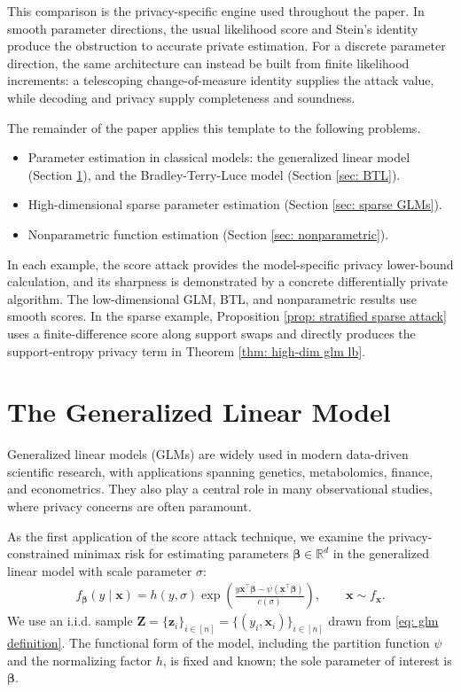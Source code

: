 \documentclass[letterpaper,12pt]{article}
\numberwithin{equation}{section}
\theoremstyle{plain}
\numberwithin{Theorem}{section}
\numberwithin{proposition}{section}
\numberwithin{Lemma}{section}
{
	\theoremstyle{definition}
	\newtheorem{Definition}{Definition}
	\newtheorem{example}{Example}
	\numberwithin{example}{section}
	\newtheorem{fact}{Fact}
	\numberwithin{fact}{section}
	\newtheorem{remark}{Remark}
}
\newcommand{\rev}[1]{#1}
\newcommand{\furtherrev}[1]{#1}
\newcommand{\1}{\mathbbm{1}}
\def\bbeta{{\boldsymbol{\beta}}}
\def\R{{\mathbb R}}
\begin{document}
\rev{This comparison is the privacy-specific engine used throughout the paper. In smooth parameter directions, the usual likelihood score and Stein's identity produce the obstruction to accurate private estimation. For a discrete parameter direction, the same architecture can instead be built from finite likelihood increments: a telescoping change-of-measure identity supplies the attack value, while decoding and privacy supply completeness and soundness.}

The remainder of the paper applies this template to the following problems.
\begin{itemize}
	\item Parameter estimation in classical models: the generalized linear model (Section \ref{sec: GLMs}), and the Bradley-Terry-Luce model (Section \ref{sec: BTL}).
	\item High-dimensional sparse parameter estimation (Section \ref{sec: sparse GLMs}).
	\item \furtherrev{Nonparametric} function estimation (Section \ref{sec: nonparametric}).
\end{itemize}
\rev{In each example, the score attack provides the model-specific privacy lower-bound calculation, and its sharpness is demonstrated by a concrete differentially private algorithm. The low-dimensional GLM, BTL, and \furtherrev{nonparametric} results use smooth scores. In the sparse example, Proposition \ref{prop: stratified sparse attack} uses a finite-difference score along support swaps and directly produces the support-entropy privacy term in Theorem \ref{thm: high-dim glm lb}.}


\section{The Generalized Linear Model}\label{sec: GLMs}
Generalized linear models (GLMs) are widely used in modern data-driven scientific research, with applications spanning genetics, metabolomics, finance, and econometrics. They also play a central role in many observational studies, where privacy concerns are often paramount.

As the first application of the score attack technique, we examine the privacy-constrained minimax risk for estimating parameters $\bbeta \in \R^d$ in the generalized linear model with scale parameter $\sigma$:
\begin{align}
		f_{\bbeta} (y\mid\bm x) = h(y, \sigma)\exp\left(\frac{y\bm x^\top \bbeta - \psi(\bm x^\top \bbeta)}{c(\sigma)}\right),\qquad \bm x \sim f_{\bm x}. \label{eq: glm definition}
\end{align}
We use an i.i.d. sample $\bm Z = \{\bm z_i\}_{i \in [n]} = \{(y_i, \bm x_i)\}_{i \in [n]}$ drawn from \eqref{eq: glm definition}. The functional form of the model, including the partition function $\psi$ and the normalizing factor $h$, is fixed and known; the sole parameter of interest is $\bbeta$.
\end{document}
